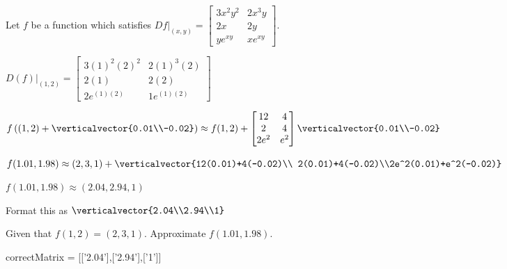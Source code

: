 \documentclass{ximera}
\begin{document}
\begin{question} 
	Let $f$ be a function which satisfies $Df\big|_{(x,y)} = \begin{bmatrix} 3x^2y^2 & 2x^3y\\ 2x&2y\\ye^{xy} & xe^{xy}\end{bmatrix}$.
	
		\begin{solution}
			\begin{hint}
				\(D(f)\big|_{(1,2)} = \begin{bmatrix} 3(1)^2(2)^2 & 2(1)^3(2)\\ 2(1) & 2(2) \\ 2e^{(1)(2)} & 1e^{(1)(2)}\end{bmatrix}\)
			\end{hint}
			\begin{hint}
				\( f\left((1,2)+ \verticalvector{0.01\\-0.02}\right)\approx f(1,2) + 
				\begin{bmatrix} 12 & 4\\2 & 4 \\ 2e^{2} & e^{2}\end{bmatrix} \verticalvector{0.01\\-0.02}\)
			\end{hint}
			\begin{hint}
				\( f(1.01,1.98) \approx (2,3,1)+ \verticalvector{12(0.01)+4(-0.02)\\ 2(0.01)+4(-0.02)\\2e^2(0.01)+e^2(-0.02)}\)
			\end{hint}
			\begin{hint}
				\( f(1.01,1.98) \approx (2.04,2.94,1)\)
			\end{hint}
			\begin{hint}
				Format this as $\verticalvector{2.04\\2.94\\1}$
			\end{hint}
			Given that \(f(1,2) = (2,3,1)\).  Approximate \(f(1.01,1.98)\).  
			\begin{matrix-answer}
				correctMatrix = [['2.04'],['2.94'],['1']]
			\end{matrix-answer}
		\end{solution}
\end{question}




	
\end{document}
